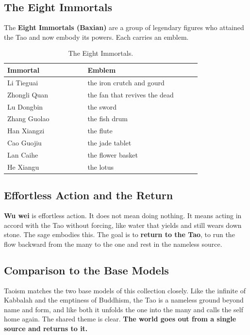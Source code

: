 \subsection{The Eight Immortals}

The \textbf{Eight Immortals (Baxian)} are a group of legendary figures who
attained the Tao and now embody its powers. Each carries an emblem.

\begin{longtable}{L{0.34\linewidth} L{0.48\linewidth}}
\caption{The Eight Immortals.}\\
\toprule
\textbf{Immortal} & \textbf{Emblem} \\
\midrule
Li Tieguai & the iron crutch and gourd \\
Zhongli Quan & the fan that revives the dead \\
Lu Dongbin & the sword \\
Zhang Guolao & the fish drum \\
Han Xiangzi & the flute \\
Cao Guojiu & the jade tablet \\
Lan Caihe & the flower basket \\
He Xiangu & the lotus \\
\bottomrule
\end{longtable}

\subsection{Effortless Action and the Return}

\textbf{Wu wei} is effortless action. It does not mean doing nothing. It means acting in accord with the Tao without forcing, like water that yields and still wears down stone. The sage embodies this. The goal is to \textbf{return to the Tao}, to run the flow backward from the many to the one and rest in the nameless source.

\subsection{Comparison to the Base Models}

Taoism matches the two base models of this collection closely. Like the infinite of Kabbalah and the emptiness of Buddhism, the Tao is a nameless ground beyond name and form, and like both it unfolds the one into the many and calls the self home again. The shared theme is clear. \textbf{The world goes out from a single source and returns to it.}
